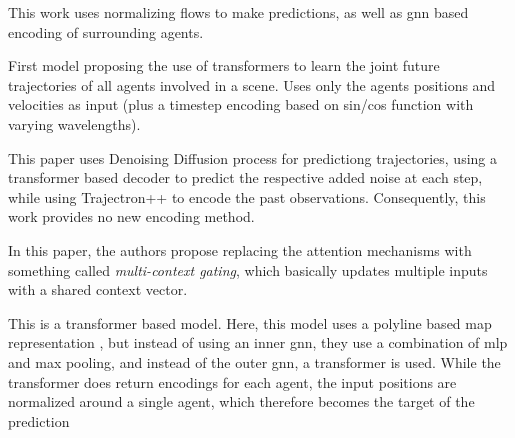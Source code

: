 \cite{scholler2021flomo} This work uses normalizing flows to make predictions, as well as gnn based encoding of surrounding agents.


\cite{messaoud2021trajectory}


\cite{yuan2021agentformer} First model proposing the use of transformers to learn the joint future trajectories of all agents involved in a scene. Uses only the agents positions and velocities as input (plus a timestep encoding based on sin/cos function with varying wavelengths). 



\cite{navarro2022social}


\cite{gu2022stochastic} This paper uses Denoising Diffusion process for predictiong trajectories, using a transformer based decoder to predict the respective added noise at each step, while using Trajectron++ to encode the past observations. Consequently, this work provides no new encoding method.


\cite{varadarajan2022multipath} In this paper, the authors propose replacing the attention mechanisms with something called \textit{multi-context gating}, which basically updates multiple inputs with a shared context vector.


\cite{shi2022motion} This is a transformer based model. Here, this model uses a polyline based map representation \cite{gao2020vectornet}, but instead of using an inner gnn, they use a combination of mlp and max pooling, and instead of the outer gnn, a transformer is used. While the transformer does return encodings for each agent, the input positions are normalized around a single agent, which therefore becomes the target of the prediction



